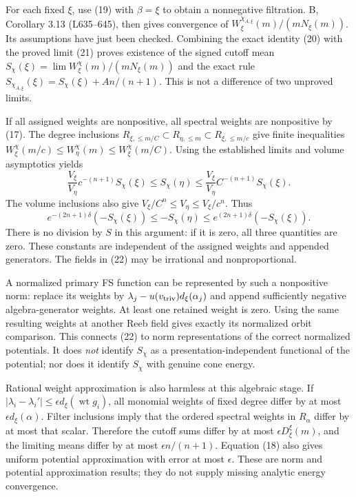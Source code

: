 \documentclass[
  11pt,
]{article}
\begin{document}
For each fixed \(\xi\), use (19) with \(\beta=\xi\) to obtain a
nonnegative filtration. B, Corollary 3.13 (L635--645), then gives
convergence of \(W_\xi^{\chi_{A,\xi}}(m)/(mN_\xi(m))\). Its assumptions
have just been checked. Combining the exact identity (20) with the
proved limit (21) proves existence of the signed cutoff mean
\(S_\chi(\xi)=\lim W_\xi^\chi(m)/(mN_\xi(m))\) and the exact rule
\(S_{\chi_{A,\xi}}(\xi)=S_\chi(\xi)+A n/(n+1)\). This is not a
difference of two unproved limits.

If all assigned weights are nonpositive, all spectral weights are
nonpositive by (17). The degree inclusions
\(R_{\xi,\leq m/C}\subset R_{\eta,\leq m}
\subset R_{\xi,\leq m/c}\) give finite inequalities
\(W_\xi^\chi(m/c)\leq W_\eta^\chi(m)\leq W_\xi^\chi(m/C)\). Using the
established limits and volume asymptotics yields \[
 \frac{V_\xi}{V_\eta}c^{-(n+1)}S_\chi(\xi)
 \leq S_\chi(\eta)\leq
 \frac{V_\xi}{V_\eta}C^{-(n+1)}S_\chi(\xi).          \tag{22}
\] The volume inclusions also give
\(V_\xi/C^n\leq V_\eta\leq V_\xi/c^n\). Thus \[
 e^{-(2n+1)\delta}(-S_\chi(\xi))
 \leq -S_\chi(\eta)\leq
 e^{(2n+1)\delta}(-S_\chi(\xi)).                    \tag{23}
\] There is no division by \(S\) in this argument: if it is zero, all
three quantities are zero. These constants are independent of the
assigned weights and appended generators. The fields in (22) may be
irrational and nonproportional.

A normalized primary FS function can be represented by such a
nonpositive norm: replace its weights by
\(\lambda_j-u(v_{\rm triv})d_\xi(\alpha_j)\) and append sufficiently
negative algebra-generator weights. At least one retained weight is
zero. Using the same resulting weights at another Reeb field gives
exactly its normalized orbit comparison. This connects (22) to norm
representations of the correct normalized potentials. It does \emph{not}
identify \(S_\chi\) as a presentation-independent functional of the
potential; nor does it identify \(S_\chi\) with genuine cone energy.

Rational weight approximation is also harmless at this algebraic stage.
If \(|\lambda_i-\lambda_i'|\leq\epsilon d_\xi(\operatorname{wt}g_i)\),
all monomial weights of fixed degree differ by at most
\(\epsilon d_\xi(\alpha)\). Filter inclusions imply that the ordered
spectral weights in \(R_\alpha\) differ by at most that scalar.
Therefore the cutoff sums differ by at most \(\epsilon D_\xi^\xi(m)\),
and the limiting means differ by at most \(\epsilon n/(n+1)\). Equation
(18) also gives uniform potential approximation with error at most
\(\epsilon\). These are norm and potential approximation results; they
do not supply missing analytic energy convergence.
\end{document}
